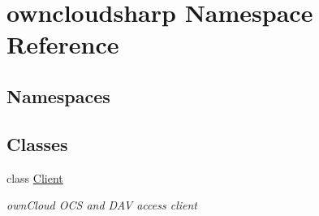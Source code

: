 \hypertarget{namespaceowncloudsharp}{}\section{owncloudsharp Namespace Reference}
\label{namespaceowncloudsharp}
\subsection*{Namespaces}
\begin{DoxyCompactItemize}
\end{DoxyCompactItemize}
\subsection*{Classes}
\begin{DoxyCompactItemize}
\item 
class \hyperlink{classowncloudsharp_1_1_client}{Client}
\begin{DoxyCompactList}\small\item\em own\+Cloud O\+CS and D\+AV access client \end{DoxyCompactList}\end{DoxyCompactItemize}

